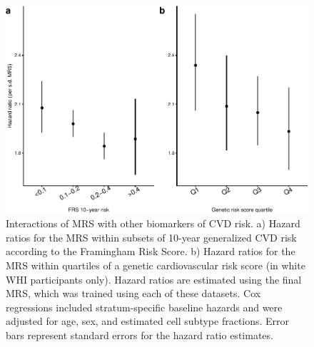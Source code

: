 \documentclass[]{article}
\begin{document}
\begin{figure}
\centering
\includegraphics{figures/plot-aggregate-interactions-1.pdf}
\caption{Interactions of MRS with other biomarkers of CVD risk. a)
Hazard ratios for the MRS within subsets of 10-year generalized CVD risk
according to the Framingham Risk Score. b) Hazard ratios for the MRS
within quartiles of a genetic cardiovascular risk score (in white WHI
participants only). Hazard ratios are estimated using the final MRS,
which was trained using each of these datasets. Cox regressions included
stratum-specific baseline hazards and were adjusted for age, sex, and
estimated cell subtype fractions. Error bars represent standard errors
for the hazard ratio estimates.}
\end{figure}
\end{document}
